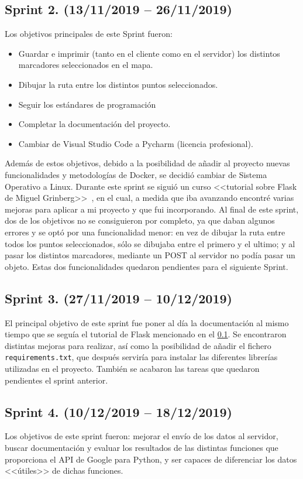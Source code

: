 \subsection{Sprint 2. (13/11/2019 -- 26/11/2019)} \label{sprint2}
Los objetivos principales de este Sprint fueron: 
\begin{itemize}
	\item Guardar e imprimir (tanto en el cliente como en el servidor) los distintos marcadores seleccionados en el mapa.
	\item Dibujar la ruta entre los distintos puntos seleccionados.
	\item Seguir los estándares de programación
	\item Completar la documentación del proyecto.
	\item Cambiar de Visual Studio Code a Pycharm (licencia profesional).
\end{itemize}
Además de estos objetivos, debido a la posibilidad de añadir al proyecto nuevas funcionalidades y metodologías de Docker, se decidió cambiar de Sistema Operativo a Linux.
Durante este sprint se siguió un curso <<tutorial sobre Flask de Miguel Grinberg>>~\cite{grinberg-mega}, en el cual, a medida que iba avanzando encontré varias mejoras para aplicar a mi proyecto y que fui incorporando.
Al final de este sprint, dos de los objetivos no se consiguieron por completo, ya que daban algunos errores y se optó por una funcionalidad menor: en vez de dibujar la ruta entre todos los puntos seleccionados, sólo se dibujaba entre el primero y el ultimo; y al pasar los distintos marcadores, mediante un POST al servidor no podía pasar un objeto. Estas dos funcionalidades quedaron pendientes para el siguiente Sprint.

\subsection{Sprint 3. (27/11/2019 -- 10/12/2019)}
El principal objetivo de este sprint fue poner al día la documentación al mismo tiempo que se seguía el tutorial de Flask mencionado en el \ref{sprint2}.
Se encontraron distintas mejoras para realizar, así como la posibilidad de añadir el fichero \texttt{requirements.txt}, que después serviría para instalar las diferentes librerías utilizadas en el proyecto.
También se acabaron las tareas que quedaron pendientes el sprint anterior.

\subsection{Sprint 4. (10/12/2019 -- 18/12/2019)}
Los objetivos de este sprint fueron: mejorar el envío de los datos al servidor, buscar documentación y evaluar los resultados de las distintas funciones que proporciona el API de Google para Python, y ser capaces de diferenciar los datos <<útiles>> de dichas funciones.

